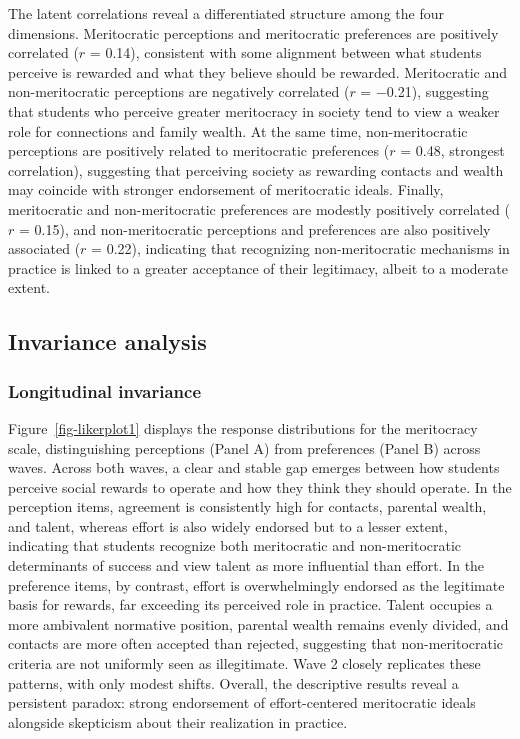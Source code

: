 \documentclass[
  13pt,
]{article}
\begin{document}
The latent correlations reveal a differentiated structure among the four
dimensions. Meritocratic perceptions and meritocratic preferences are
positively correlated (\(r\) = 0.14), consistent with some alignment
between what students perceive is rewarded and what they believe should
be rewarded. Meritocratic and non-meritocratic perceptions are
negatively correlated (\(r\) = −0.21), suggesting that students who
perceive greater meritocracy in society tend to view a weaker role for
connections and family wealth. At the same time, non-meritocratic
perceptions are positively related to meritocratic preferences (\(r\) =
0.48, strongest correlation), suggesting that perceiving society as
rewarding contacts and wealth may coincide with stronger endorsement of
meritocratic ideals. Finally, meritocratic and non-meritocratic
preferences are modestly positively correlated (\(r\) = 0.15), and
non-meritocratic perceptions and preferences are also positively
associated (\(r\) = 0.22), indicating that recognizing non-meritocratic
mechanisms in practice is linked to a greater acceptance of their
legitimacy, albeit to a moderate extent.

\subsection{Invariance analysis}\label{invariance-analysis}

\subsubsection{Longitudinal invariance}\label{longitudinal-invariance}

Figure~\ref{fig-likerplot1} displays the response distributions for the
meritocracy scale, distinguishing perceptions (Panel A) from preferences
(Panel B) across waves. Across both waves, a clear and stable gap
emerges between how students perceive social rewards to operate and how
they think they should operate. In the perception items, agreement is
consistently high for contacts, parental wealth, and talent, whereas
effort is also widely endorsed but to a lesser extent, indicating that
students recognize both meritocratic and non-meritocratic determinants
of success and view talent as more influential than effort. In the
preference items, by contrast, effort is overwhelmingly endorsed as the
legitimate basis for rewards, far exceeding its perceived role in
practice. Talent occupies a more ambivalent normative position, parental
wealth remains evenly divided, and contacts are more often accepted than
rejected, suggesting that non-meritocratic criteria are not uniformly
seen as illegitimate. Wave 2 closely replicates these patterns, with
only modest shifts. Overall, the descriptive results reveal a persistent
paradox: strong endorsement of effort-centered meritocratic ideals
alongside skepticism about their realization in practice.
\end{document}
